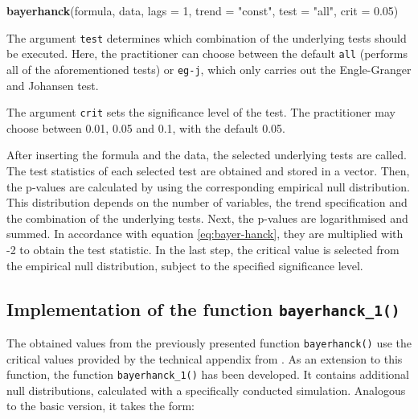 \documentclass[11pt,a4paper]{article}
\newenvironment{Shaded}{\begin{snugshade}}{\end{snugshade}}
\newcommand{\DataTypeTok}[1]{\textcolor[rgb]{0.13,0.29,0.53}{#1}}
\newcommand{\DecValTok}[1]{\textcolor[rgb]{0.00,0.00,0.81}{#1}}
\newcommand{\FloatTok}[1]{\textcolor[rgb]{0.00,0.00,0.81}{#1}}
\newcommand{\KeywordTok}[1]{\textcolor[rgb]{0.13,0.29,0.53}{\textbf{#1}}}
\newcommand{\NormalTok}[1]{#1}
\newcommand{\StringTok}[1]{\textcolor[rgb]{0.31,0.60,0.02}{#1}}
\begin{document}
\begin{Shaded}
\begin{Highlighting}[]
\KeywordTok{bayerhanck}\NormalTok{(formula, data, }\DataTypeTok{lags =} \DecValTok{1}\NormalTok{, }\DataTypeTok{trend =} \StringTok{"const"}\NormalTok{, }
           \DataTypeTok{test =} \StringTok{"all"}\NormalTok{, }\DataTypeTok{crit =} \FloatTok{0.05}\NormalTok{)}
\end{Highlighting}
\end{Shaded}

The argument \texttt{test} determines which combination of the
underlying tests should be executed. Here, the practitioner can choose
between the default \texttt{all} (performs all of the aforementioned
tests) or \texttt{eg-j}, which only carries out the Engle-Granger and
Johansen test.

The argument \texttt{crit} sets the significance level of the test. The
practitioner may choose between 0.01, 0.05 and 0.1, with the default
0.05.

After inserting the formula and the data, the selected underlying tests
are called. The test statistics of each selected test are obtained and
stored in a vector. Then, the p-values are calculated by using the
corresponding empirical null distribution. This distribution depends on
the number of variables, the trend specification and the combination of
the underlying tests. Next, the p-values are logarithmised and summed.
In accordance with equation \eqref{eq:bayer-hanck}, they are multiplied
with -2 to obtain the test statistic. In the last step, the critical
value is selected from the empirical null distribution, subject to the
specified significance level.

\hypertarget{implementation-of-the-function-bayerhanck_1}{%
\subsection{\texorpdfstring{Implementation of the function
\texttt{bayerhanck\_1()}}{Implementation of the function bayerhanck\_1()}}\label{implementation-of-the-function-bayerhanck_1}}

The obtained values from the previously presented function
\texttt{bayerhanck()} use the critical values provided by the technical
appendix from \textcite{Bayerhanck2009}. As an extension to this
function, the function \texttt{bayerhanck\_1()} has been developed. It
contains additional null distributions, calculated with a specifically
conducted simulation. Analogous to the basic version, it takes the form:
\end{document}
